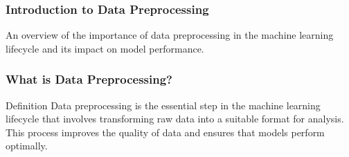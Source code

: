 \documentclass[aspectratio=169]{beamer}
\begin{document}
\frame{\titlepage}

\begin{frame}[fragile]
    \frametitle{Introduction to Data Preprocessing}
    An overview of the importance of data preprocessing in the machine learning lifecycle and its impact on model performance.
\end{frame}

\begin{frame}[fragile]
    \frametitle{What is Data Preprocessing?}
    \begin{block}{Definition}
        Data preprocessing is the essential step in the machine learning lifecycle that involves transforming raw data into a suitable format for analysis. This process improves the quality of data and ensures that models perform optimally.
    \end{block}
\end{frame}
\end{document}
